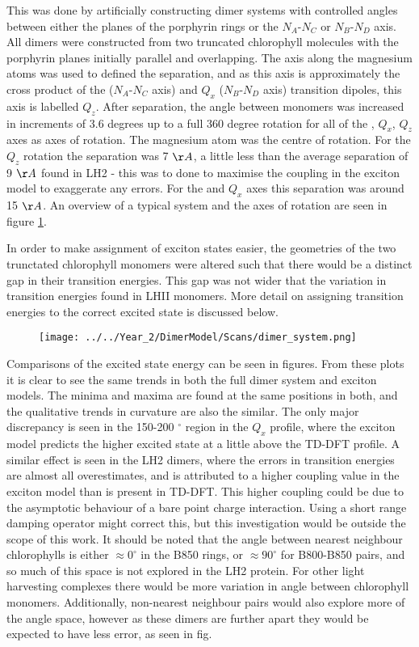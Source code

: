 This was done by artificially constructing dimer systems with controlled angles 
between either the planes of the porphyrin rings or the $N_A$-$N_C$ or $N_B$-$N_D$
axis. All dimers were constructed from two truncated chlorophyll molecules with 
the porphyrin planes initially parallel and overlapping. The axis along the magnesium
atoms was used to defined the separation, and as this axis is approximately the 
cross product of the \Qy ($N_A$-$N_C$ axis) and $Q_x$ ($N_B$-$N_D$ axis) transition
dipoles, this axis is labelled $Q_z$. After separation, the angle between monomers
was increased in increments of 3.6 degrees up to a full 360 degree rotation for 
all of the \Qy, $Q_x$, $Q_z$ axes as axes of rotation. The magnesium atom was the 
centre of rotation. For the $Q_z$ rotation the separation was 7 $\AA{}$, a little 
less than the average separation of 9 $\AA{}$ found in LH2 - this was to done to 
maximise the coupling in the exciton model to exaggerate any errors. For the \Qy
and $Q_x$ axes this separation was around 15 $\AA{}$. An overview of a typical
system and the axes of rotation are seen in figure \ref{fig:dimer_system}.

In order to make assignment of exciton states easier, the geometries of the two 
trunctated chlorophyll monomers were altered such that there would be a distinct 
gap in their transition energies. This gap was not wider that the variation in 
transition energies found in LHII monomers. More detail on assigning transition 
energies to the correct excited state is discussed below.
\begin{figure}
    \centering
    \texttt{[image: ../../Year\_2/DimerModel/Scans/dimer\_system.png]}
    \label{fig:dimer_system}
\end{figure}

Comparisons of the excited state energy can be seen in figures. From these plots
it is clear to see the same trends in both the full dimer system and exciton models.
The minima and maxima are found at the same positions in both, and the qualitative
trends in curvature are also the similar. The only major discrepancy is seen in
the 150-200 $^{\circ}$ region in the $Q_x$ profile, where the exciton model predicts
the higher excited state at a little above the TD-DFT profile. A similar effect
is seen in the LH2 dimers, where the errors in transition energies are almost all
overestimates, and is attributed to a higher coupling value in the exciton model
than is present in TD-DFT. This higher coupling could be due to the asymptotic behaviour
of a bare point charge interaction. Using a short range damping operator might correct
this, but this investigation would be outside the scope of this work.  
It should be noted that the angle between nearest neighbour chlorophylls is either
$\approx 0 ^{\circ}$ in the B850 rings, or $\approx 90 ^{\circ}$ for B800-B850 pairs, and so much
of this space is not explored in the LH2 protein. For other light harvesting complexes
there would be more variation in angle between chlorophyll monomers. Additionally,
non-nearest neighbour pairs would also explore more of the angle space, however
as these dimers are further apart they would be expected to have less error, as 
seen in fig.

